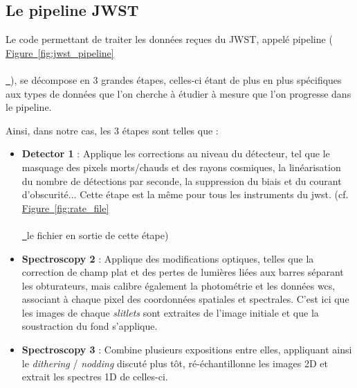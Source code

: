 \documentclass[12pt, a4paper]{article}
\newcommand*{\figref}[2][]{%
  \hyperref[{#2}]{%
    Figure~\ref*{#2}%
    \ifx\\#1\\%
    \else
      \,#1%
    \fi
  }%
}
\begin{document}
\subsection{Le pipeline JWST}

Le code permettant de traiter les données reçues du JWST, appelé pipeline (\figref{fig:jwst_pipeline}), se décompose en 3 grandes étapes, celles-ci étant de plus en plus spécifiques aux types de données que l'on cherche à étudier à mesure que l'on progresse dans le pipeline.

Ainsi, dans notre cas, les 3 étapes sont telles que :\\


\begin{minipage}{.45\linewidth}
  \begin{itemize}[left=0cm]
    \item \textbf{Detector 1} : Applique les corrections au niveau du détecteur, tel que le masquage des pixels morts/chauds et des rayons cosmiques, la linéarisation du nombre de détections par seconde, la suppression du biais et du courant d'obscurité... Cette étape est la même pour tous les instruments du \gls{jwst}. (cf. \figref{fig:rate_file} le fichier en sortie de cette étape)
    \item \textbf{Spectroscopy 2} : Applique des modifications optiques, telles que la correction de champ plat et des pertes de lumières liées aux barres séparant les obturateurs, mais calibre également la photométrie et les données \gls{wcs}, associant à chaque pixel des coordonnées spatiales et spectrales. C'est ici que les images de chaque \textit{slitlets} sont extraites de l'image initiale et que la soustraction du fond s'applique.
    \item \textbf{Spectroscopy 3} : Combine plusieurs expositions entre elles, appliquant ainsi le \textit{dithering} / \textit{nodding} discuté plus tôt, ré-échantillonne les images 2D et extrait les spectres 1D de celles-ci.
  \end{itemize}
  \end{minipage}
  \hfill
\end{document}
